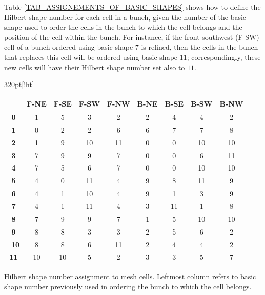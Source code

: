 Table \ref{TAB_ASSIGNEMENTS_OF_BASIC_SHAPES} shows how to define the
Hilbert shape number for each cell in a bunch, given the number of
the basic shape used to order the cells in the bunch to which the
cell belongs and the position of the cell within the bunch. For
instance, if the front southwest (F-SW) cell of a bunch ordered
using basic shape $7$ is refined, then the cells in the bunch that
replaces this cell will be ordered using basic shape $11$;
correspondingly, these new cells will have their Hilbert shape
number set also to $11$.

\begin{acmtable}{320pt}[!ht]
    \begin{center}
        \begin{tabular}{|c|c|c|c|c|c|c|c|c|}
            \hline
                & \textbf{F-NE} & \textbf{F-SE} &\textbf{F-SW}& \textbf{F-NW} & \textbf{B-NE}
                & \textbf{B-SE} & \textbf{B-SW} & \textbf{B-NW} \\
            \hline
            \textbf{0} & 1 & 5 & 3 & 2 & 2 & 4 & 4 & 2 \\
            \hline
            \textbf{1} & 0 & 2 & 2 & 6 & 6 & 7 & 7 & 8 \\
            \hline
            \textbf{2} & 1 & 9 & 10 & 11 & 0 & 0 & 10 & 10 \\
            \hline
            \textbf{3} & 7 & 9 & 9 & 7 & 0 & 0 & 6 & 11 \\
            \hline
            \textbf{4} & 7 & 5 & 6 & 7 & 0 & 0 & 10 & 10 \\
            \hline
            \textbf{5} & 4 & 0 & 11 & 4 & 9 & 8 & 11 & 9 \\
            \hline
            \textbf{6} & 4 & 1 & 10 & 4 & 9 & 1 & 3 & 9 \\
            \hline
            \textbf{7} & 4 & 1 & 11 & 4 & 3 & 11 & 1 & 8 \\
            \hline
            \textbf{8} & 7 & 9 & 9 & 7 & 1 & 5 & 10 & 10 \\
            \hline
            \textbf{9} & 8 & 8 & 3 & 3 & 2 & 5 & 6 & 2 \\
            \hline\
            \textbf{10} & 8 & 8 & 6 & 11 & 2 & 4 & 4 & 2 \\
            \hline
            \textbf{11} & 10 & 10 & 5 & 2 & 3 & 3 & 5 & 7 \\
            \hline
        \end{tabular}
    \end{center}
    \caption{Hilbert shape number assignment to mesh cells.
     Leftmost column refers to basic shape number previously used in ordering the bunch to which the cell belongs.}
    \label{TAB_ASSIGNEMENTS_OF_BASIC_SHAPES}
\end{acmtable}

